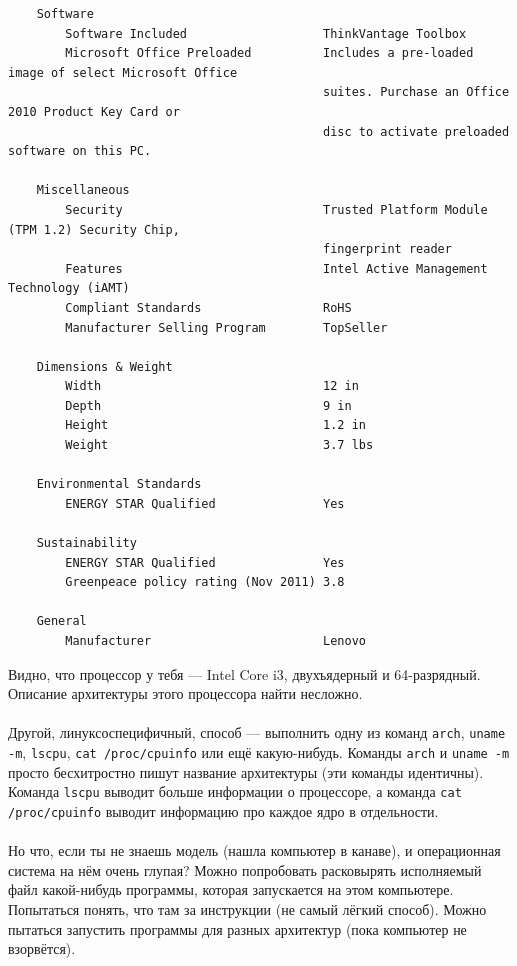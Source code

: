 \documentclass[11pt]{book}
\begin{document}
\begin{tiny}
\begin{verbatim}
    Software
        Software Included                   ThinkVantage Toolbox
        Microsoft Office Preloaded          Includes a pre-loaded image of select Microsoft Office
                                            suites. Purchase an Office 2010 Product Key Card or
                                            disc to activate preloaded software on this PC.

    Miscellaneous
        Security                            Trusted Platform Module (TPM 1.2) Security Chip,
                                            fingerprint reader
        Features                            Intel Active Management Technology (iAMT)
        Compliant Standards                 RoHS
        Manufacturer Selling Program        TopSeller

    Dimensions & Weight
        Width                               12 in
        Depth                               9 in
        Height                              1.2 in
        Weight                              3.7 lbs

    Environmental Standards
        ENERGY STAR Qualified               Yes

    Sustainability
        ENERGY STAR Qualified               Yes
        Greenpeace policy rating (Nov 2011) 3.8

    General
        Manufacturer                        Lenovo
\end{verbatim}
\end{tiny}
Видно, что процессор у тебя --- Intel Core i3, двухъядерный и 64-разрядный. Описание
архитектуры этого процессора найти несложно.
\\ \\
Другой, линуксоспецифичный, способ --- выполнить одну из
команд \texttt{arch}, \texttt{uname -m}, \texttt{lscpu}, \texttt{cat /proc/cpuinfo} или ещё какую-нибудь.
Команды \texttt{arch} и \texttt{uname -m} просто бесхитростно пишут название архитектуры (эти команды идентичны).
Команда \texttt{lscpu} выводит больше информации о процессоре,
а команда \texttt{cat /proc/cpuinfo} выводит информацию про каждое ядро в отдельности.
\\ \\
Но что, если ты не знаешь модель (нашла компьютер в канаве), и операционная система на нём
очень глупая? Можно попробовать расковырять исполняемый файл какой-нибудь программы, которая запускается
на этом компьютере. Попытаться понять, что там за инструкции (не самый лёгкий способ).
Можно пытаться запустить программы для разных архитектур (пока компьютер не взорвётся).
\end{document}

